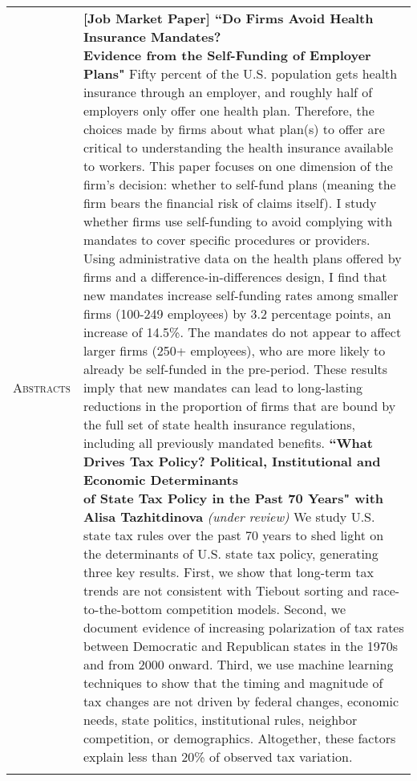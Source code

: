 \documentclass[11pt]{article}
\begin{document}
\begin{tabularx}{\textwidth}{@{}Y Z@{}}
	\textsc{Abstracts}  & 
	\textbf{[Job Market Paper] ``Do Firms Avoid Health Insurance Mandates? \newline Evidence from the Self-Funding of Employer Plans"} \newline
	\vspace{-8pt} \newline
	Fifty percent of the U.S. population gets health insurance through an employer, and roughly half of employers only offer one health plan. Therefore, the choices made by firms about what plan(s) to offer are critical to understanding the health insurance available to workers. This paper focuses on one dimension of the firm's decision: whether to self-fund plans (meaning the firm bears the financial risk of claims itself). I study whether firms use self-funding to avoid complying with mandates to cover specific procedures or providers. Using administrative data on the health plans offered by firms and a difference-in-differences design, I find that new mandates increase self-funding rates among smaller firms (100-249 employees) by 3.2 percentage points, an increase of 14.5\%. The mandates do not appear to affect larger firms (250+ employees), who are more likely to already be self-funded in the pre-period. These results imply that new mandates can lead to long-lasting reductions in the proportion of firms that are bound by the full set of state health insurance regulations, including all previously mandated benefits. 
	\vspace{20pt} \newline
	\textbf{``What Drives Tax Policy? Political, Institutional and Economic Determinants  \newline of State Tax Policy in the Past 70 Years" with Alisa Tazhitdinova} \textit{(under review)} 
	\vspace{-8pt} \newline 
	We study U.S. state tax rules over the past 70 years to shed light on the determinants of U.S. state tax policy, generating three key results. First, we show that long-term tax trends are not consistent with Tiebout sorting and race-to-the-bottom competition models. Second, we document evidence of increasing polarization of tax rates between Democratic and Republican states in the 1970s and from 2000 onward. Third, we use machine learning techniques to show that the timing and magnitude of tax changes are not driven by federal changes, economic needs, state politics, institutional rules, neighbor competition, or demographics. Altogether, these factors explain less than 20\% of observed tax variation.  \newline \href{https://www.s-robinson.com/research/Robinson_Tazhitdinova_Tax_Policy_Determinants.pdf}{\color{blue}{[Link to paper]}}
	\\
	\newpage
	

\end{tabularx}
\end{document}
